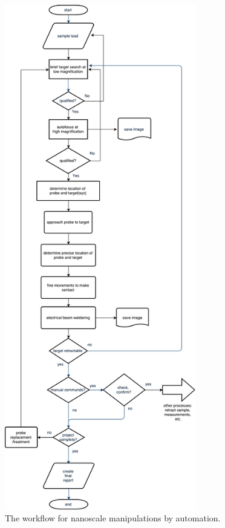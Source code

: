 \begin{figure}  
\centering
\includegraphics[width=236pt]{figures/figure7_ai}
\caption[Artificial intelligence for nanomanipulation]
{The workflow for nanoscale manipulations by automation.
\label{fig:7_aiworkflow}}
\end{figure}

